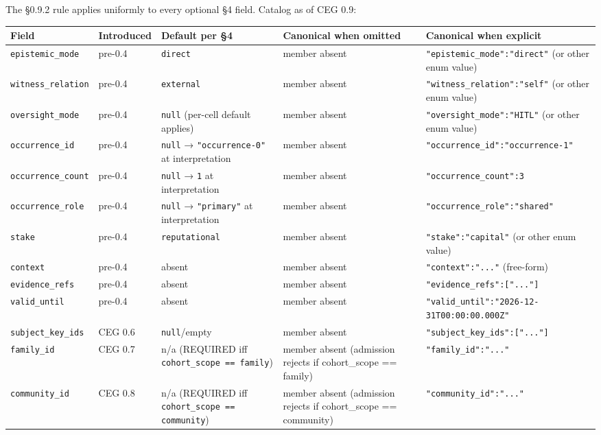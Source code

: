 \documentclass[10pt]{article}
\begin{document}
The §0.9.2 rule applies uniformly to every optional §4 field. Catalog as of CEG 0.9:


{\scriptsize
\begin{longtable}{|p{3.2cm}|p{3.2cm}|p{3.2cm}|p{3.2cm}|p{3.2cm}|}\hline
\textbf{Field} & \textbf{Introduced} & \textbf{Default per §4} & \textbf{Canonical when omitted} & \textbf{Canonical when explicit} \\ \hline\endhead
\texttt{epistemic\_mode} & pre-0.4 & \texttt{direct} & member absent & \texttt{"epistemic\_mode":"direct"} (or other enum value) \\ \hline
\texttt{witness\_relation} & pre-0.4 & \texttt{external} & member absent & \texttt{"witness\_relation":"self"} (or other enum value) \\ \hline
\texttt{oversight\_mode} & pre-0.4 & \texttt{null} (per-cell default applies) & member absent & \texttt{"oversight\_mode":"HITL"} (or other enum value) \\ \hline
\texttt{occurrence\_id} & pre-0.4 & \texttt{null} → \texttt{"occurrence-0"} at interpretation & member absent & \texttt{"occurrence\_id":"occurrence-1"} \\ \hline
\texttt{occurrence\_count} & pre-0.4 & \texttt{null} → \texttt{1} at interpretation & member absent & \texttt{"occurrence\_count":3} \\ \hline
\texttt{occurrence\_role} & pre-0.4 & \texttt{null} → \texttt{"primary"} at interpretation & member absent & \texttt{"occurrence\_role":"shared"} \\ \hline
\texttt{stake} & pre-0.4 & \texttt{reputational} & member absent & \texttt{"stake":"capital"} (or other enum value) \\ \hline
\texttt{context} & pre-0.4 & absent & member absent & \texttt{"context":"..."} (free-form) \\ \hline
\texttt{evidence\_refs} & pre-0.4 & absent & member absent & \texttt{"evidence\_refs":["..."]} \\ \hline
\texttt{valid\_until} & pre-0.4 & absent & member absent & \texttt{"valid\_until":"2026-12-31T00:00:00.000Z"} \\ \hline
\texttt{subject\_key\_ids} & CEG 0.6 & \texttt{null}/empty & member absent & \texttt{"subject\_key\_ids":["..."]} \\ \hline
\texttt{family\_id} & CEG 0.7 & n/a (REQUIRED iff \texttt{cohort\_scope == family}) & member absent (admission rejects if cohort\_scope == family) & \texttt{"family\_id":"..."} \\ \hline
\texttt{community\_id} & CEG 0.8 & n/a (REQUIRED iff \texttt{cohort\_scope == community}) & member absent (admission rejects if cohort\_scope == community) & \texttt{"community\_id":"..."} \\ \hline

\end{longtable}}
\end{document}
